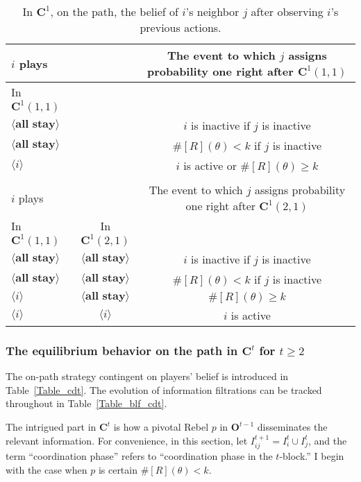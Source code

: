 \documentclass[12pt,letter]{article}
\newcommand{\Kappa}{\mathbf{C}}
\newcommand{\Omicron}{\mathbf{O}}
\theoremstyle{definition}
\theoremstyle{remark}
\theoremstyle{claim}
\begin{document}
\begin{table}[!htbp]
\caption{In $\Kappa^1$, on the path, the belief of $i$'s neighbor $j$ after observing $i$'s previous actions.}
\label{Table_blf_cd0}
\begin{center}
\begin{tabular}{l  c | c}
 	$i$ plays	  			&	  &  The event to which $j$ assigns probability one  right after $\Kappa^1(1,1)$\\
\hline
\hline
In $\Kappa^1(1,1)$	&		&		  \\
\hline
  $\langle \textbf{all stay} \rangle$	& &   $i$ is inactive if $j$ is inactive \\
  $\langle \textbf{all stay} \rangle$	&  &  $\#[R](\theta)< k$ if $j$ is inactive\\
  $\langle i \rangle$	&	&  $i$ is active or $\#[R](\theta)\geq k$    \\
  \hline
  \\
 	$i$ plays	  	&  	  &The event to which $j$ assigns probability one  right after $\Kappa^1(2,1)$\\
\hline
\hline
	In $\Kappa^1(1,1)$		&			In $\Kappa^1(2,1)$	&  \\
\hline
  $\langle \textbf{all stay} \rangle$	&  $\langle \textbf{all stay} \rangle$ &  $i$ is inactive if $j$ is inactive \\
  $\langle \textbf{all stay} \rangle$	&  $\langle \textbf{all stay} \rangle$ &  $\#[R](\theta)< k$ if $j$ is inactive\\
  $\langle i \rangle$	&	$\langle \textbf{all stay} \rangle$ &  $\#[R](\theta)\geq k$    \\
  $\langle i \rangle$	&	$\langle i \rangle$ &  $i$ is active  \\
  \hline
\end{tabular}
\end{center}
\end{table}




\subsubsection{The equilibrium behavior on the path in $\Kappa^t$ for $t\geq 2$}
\label{sec:cdt}
The on-path strategy contingent on players' belief is introduced in Table~\ref{Table_cdt}. The evolution of information filtrations can be tracked throughout in Table~\ref{Table_blf_cdt}. 

The intrigued part in $\Kappa^t$ is how a pivotal Rebel $p$ in $\Omicron^{t-1}$ disseminates the relevant information. For convenience, in this section, let $I^{t+1}_{ij}=I^t_i\cup I^t_j$, and the term ``coordination phase'' refers to ``coordination phase in the $t$-block.'' I begin with the case when $p$ is certain $\#[R](\theta)< k$.
\end{document}
